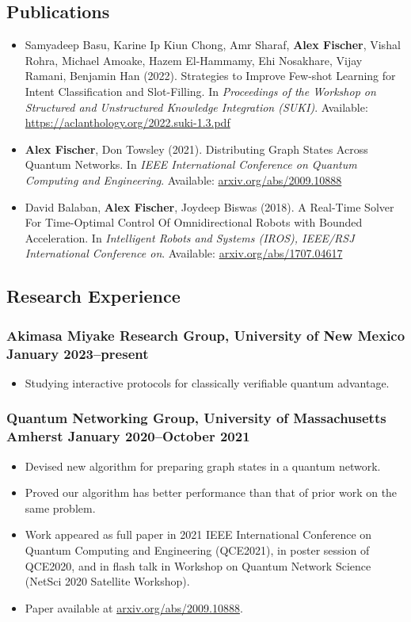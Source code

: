 \documentclass{article}
\begin{document}
	\subsection*{Publications}
		\begin{itemize}[noitemsep,leftmargin=40pt]
		\item Samyadeep Basu, Karine Ip Kiun Chong, Amr Sharaf, \textbf{Alex Fischer}, Vishal Rohra,
		Michael Amoake, Hazem El-Hammamy, Ehi Nosakhare, Vijay Ramani, Benjamin Han (2022). Strategies to Improve Few-shot Learning for Intent Classification and	Slot-Filling. In \textit{Proceedings of the Workshop on Structured and Unstructured Knowledge Integration (SUKI)}. Available: \href{https://aclanthology.org/2022.suki-1.3.pdf}{https://aclanthology.org/2022.suki-1.3.pdf}
		\item \textbf{Alex Fischer}, Don Towsley (2021). Distributing Graph States Across Quantum Networks. In \textit{IEEE International Conference on Quantum Computing and Engineering}. Available: \href{https://arxiv.org/abs/2009.10888}{arxiv.org/abs/2009.10888}
		\item David Balaban, \textbf{Alex Fischer}, Joydeep Biswas (2018). A Real-Time Solver For Time-Optimal Control Of Omnidirectional Robots with Bounded Acceleration. In \textit{Intelligent Robots and Systems (IROS), IEEE/RSJ International Conference on}. Available: \href{https://arxiv.org/abs/1707.04617}{arxiv.org/abs/1707.04617}
		\end{itemize}
	\subsection*{Research Experience}
		\subsubsection*{Akimasa Miyake Research Group, University of New Mexico \hfill \normalfont \normalsize January 2023--present}
			\begin{itemize}[noitemsep,leftmargin=40pt]
				\item Studying interactive protocols for classically verifiable quantum advantage.
			\end{itemize}
		\subsubsection*{Quantum Networking Group, University of Massachusetts Amherst \hfill \normalfont \normalsize January 2020--October 2021}
			\begin{itemize}[noitemsep,leftmargin=40pt]
				\item Devised new algorithm for preparing graph states in a quantum network.
				\item Proved our algorithm has better performance than that of prior work on the same problem.
				\item Work appeared as full paper in 2021 IEEE International Conference on Quantum Computing and Engineering (QCE2021), in poster session of QCE2020, and in flash talk in Workshop on Quantum Network Science (NetSci 2020 Satellite Workshop).
				\item Paper available at \href{https://arxiv.org/abs/2009.10888}{arxiv.org/abs/2009.10888}.
			\end{itemize}
\end{document}
